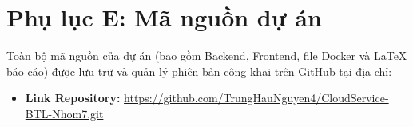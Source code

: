 \section*{Phụ lục E: Mã nguồn dự án}
Toàn bộ mã nguồn của dự án (bao gồm Backend, Frontend, file Docker và LaTeX báo cáo) được lưu trữ và quản lý phiên bản công khai trên GitHub tại địa chỉ:
\begin{itemize}
    \item \textbf{Link Repository:} \url{https://github.com/TrungHauNguyen4/CloudService-BTL-Nhom7.git}
\end{itemize}
